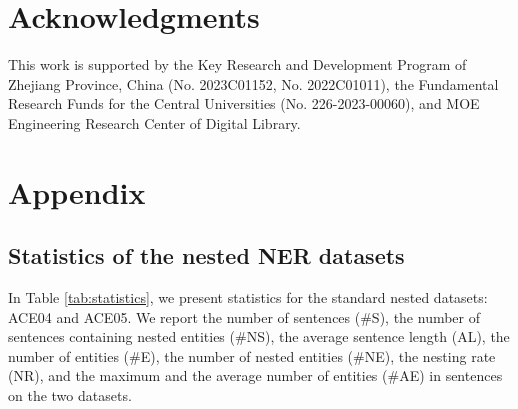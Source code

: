 \documentclass[11pt]{article}
\begin{document}
\section*{Acknowledgments}
This work is supported by the Key Research and Development Program of Zhejiang Province, China (No. 2023C01152, No. 2022C01011), the Fundamental Research Funds for the Central Universities (No. 226-2023-00060), and MOE Engineering Research Center of Digital Library.




\clearpage

\appendix

\section{Appendix}


\subsection{Statistics of the nested NER datasets}
\label{app:statistics}

In Table \ref{tab:statistics}, we present statistics for the standard nested datasets: ACE04 and ACE05. We report the number of sentences (\#S), the number of sentences containing nested entities (\#NS), the average sentence length (AL), the number of entities (\#E), the number of nested entities (\#NE), the nesting rate (NR), and the maximum and the average number of entities (\#AE) in sentences on the two datasets.
\end{document}
